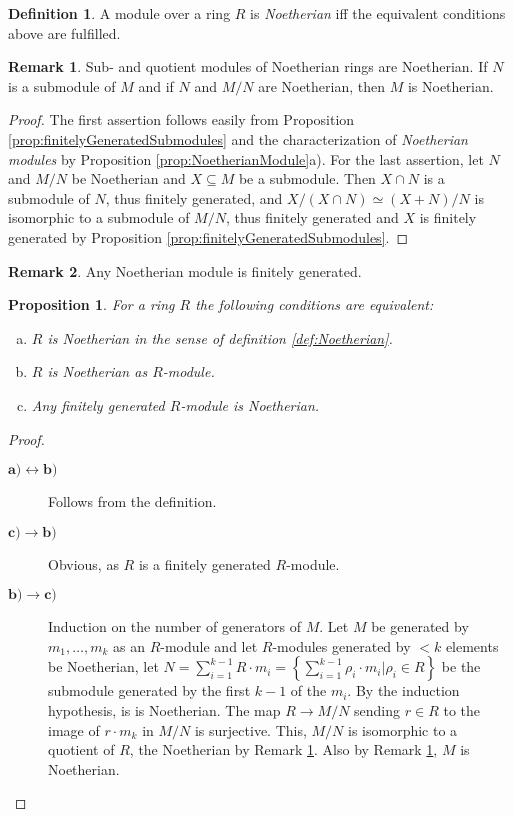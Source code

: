 \documentclass[DIV=14,parskip=half]{scrartcl}
\newtheorem{prop}{Proposition}[subsection]
\theoremstyle{definition}
\newtheorem{defi}{Definition}[subsection]
\newtheorem{rem}{Remark}[subsection]
\newcommand{\longto}{\longrightarrow}
\begin{document}
\begin{defi}\label{def:NoetherianModule}
 A module over a ring $R$ is \emph{Noetherian} iff the equivalent conditions above are fulfilled.
\end{defi}
\begin{rem}\label{rem:subQuotientNoetherian}
 Sub- and quotient modules of Noetherian rings are Noetherian. If $N$ is a submodule of $M$ and if $N$ and $M/N$ are Noetherian, then $M$ is Noetherian.
\end{rem}
\begin{proof}
 The first assertion follows easily from Proposition \ref{prop:finitelyGeneratedSubmodules} and the characterization of \emph{Noetherian modules} by Proposition \ref{prop:NoetherianModule}a). For the last assertion, let $N$ and $M/N$ be Noetherian and $X\subseteq M$ be a submodule. Then $X\cap N$ is a submodule of $N$, thus finitely generated, and $X/(X\cap N) \simeq (X+N)/N$ is isomorphic to a submodule of $M/N$, thus finitely generated and $X$ is finitely generated by Proposition \ref{prop:finitelyGeneratedSubmodules}. 
\end{proof}
\begin{rem}
 Any Noetherian module is finitely generated.
\end{rem}
\begin{prop}\label{prop:ringNoetherianModule}
 For a ring $R$ the following conditions are equivalent:
 \begin{enumerate}[a)]
  \item $R$ is Noetherian in the sense of definition \ref{def:Noetherian}.
  \item $R$ is Noetherian as $R$-module.
  \item Any finitely generated $R$-module is Noetherian.
 \end{enumerate}

\end{prop}
\begin{proof}
 \begin{description}
  \item [$\mathbf{a)\leftrightarrow b)}$] Follows from the definition.
  \item [$\mathbf{c)\to b)}$] Obvious, as $R$ is a finitely generated $R$-module.
  \item [$\mathbf{b)\to c)}$] Induction on the number of generators of $M$. Let $M$ be generated by $m_1,\dots,m_k$ as an $R$-module and let $R$-modules generated by $<k$ elements be Noetherian, let $N= \sum_{i=1}^{k-1} R\cdot m_i = \left\{\sum_{i=1}^{k-1} \rho_i\cdot m_i |\rho_i \in R\right\}$ be the submodule generated by the first $k-1$ of the $m_i$. By the induction hypothesis, is is Noetherian. The map $R\longto M/N$ sending $r\in R$ to the image of $r\cdot m_k$ in $M/N$ is surjective. This, $M/N$ is isomorphic to a quotient of $R$, the Noetherian by Remark \ref{rem:subQuotientNoetherian}. Also by Remark \ref{rem:subQuotientNoetherian}, $M$ is Noetherian.
 \end{description}

\end{proof}
\end{document}

